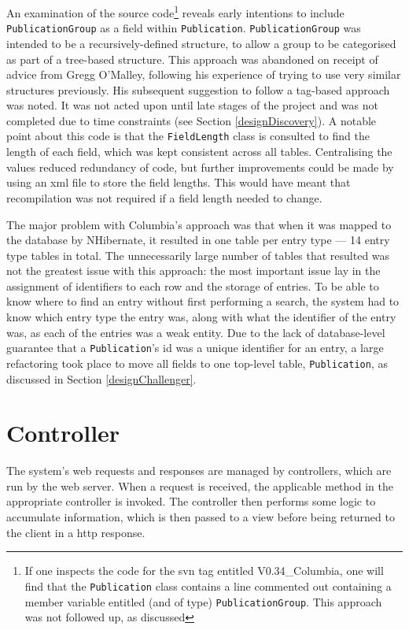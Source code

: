An examination of the source code\footnote{If one inspects the code for the \gls{svn} tag entitled V0.34\_Columbia, one will find that the \texttt{Publication} class contains a line commented out containing a member variable entitled (and of type) \texttt{PublicationGroup}.  This approach was not followed up, as discussed} reveals early intentions to include \texttt{PublicationGroup} as a field within \texttt{Publication}.  \texttt{PublicationGroup} was intended to be a recursively-defined structure, to allow a group to be categorised as part of a tree-based structure.  This approach was abandoned on receipt of advice from Gregg O'Malley, following his experience of trying to use very similar structures previously.  His subsequent suggestion to follow a tag-based approach was noted. It was not acted upon until late stages of the project and was not completed due to time constraints (see Section \ref{designDiscovery}).  A notable point about this code is that the \texttt{FieldLength} class is consulted to find the length of each field, which was kept consistent across all tables.  Centralising the values reduced redundancy of code, but further improvements could be made by using an \gls{xml} file to store the field lengths. This would have meant that recompilation was not required if a field length needed to change.

The major problem with Columbia's approach was that when it was mapped to the database by NHibernate, it resulted in one table per entry type --- 14 entry type tables in total.  The unnecessarily large number of tables that resulted was not the greatest issue with this approach: the most important issue lay in the assignment of identifiers to each row and the storage of entries.  To be able to know where to find an entry without first performing a search, the system had to know which entry type the entry was, along with what the identifier of the entry was, as each of the entries was a weak entity.  Due to the lack of database-level guarantee that a \texttt{Publication}'s id was a unique identifier for an entry, a large refactoring took place to move all fields to one top-level table, \texttt{Publication}, as discussed in Section \ref{designChallenger}.

\section{Controller}
The system's web requests and responses are managed by controllers, which are run by the web server.  When a request is received, the applicable method in the appropriate controller is invoked.  The controller then performs some logic to accumulate information, which is then passed to a view before being returned to the client in a \gls{http} response.


